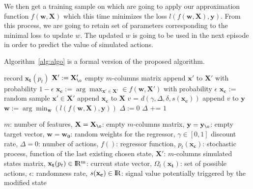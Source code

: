 \documentclass[letterpaper, 10.5 pt, conference]{ieeeconf}
\newcommand{\B}[1]{\mathbf{#1}}
\begin{document}
We then get a training sample on which are going to apply our approximation function $f(\B{w}, \B{X})$ which this time minimizes the loss $l(f(\B{w}, \B{X}),\B{y})$. From this process, we are going to retain set of parameters corresponding to the minimal loss to update $w$. The updated $w$ is going to be used in the next episode in order to predict the value of simulated actions.

Algorithm~\ref{alg:algo} is a formal version of the proposed algorithm.

\begin{algorithm}

\begin{algorithmic}[1]

\vspace{3mm}
  \State record $\B{x_t}(p_t)$
    \State $\B{X'} :=\B{X'_{\o}}$ empty $m$-columns matrix
    \For{$\B{x'}$  in  $\Omega(\B{x_t})$}
      \State append  $\B{x'}$  to  $\B{X'}$
    \EndFor
    \State with probability  $1-\epsilon$
    \State \hspace{0.5cm} $\B{x_c}:=\arg\max_{\B{x'} \in \B{X'}} \in f(\B{w},\B{X'})$
    \State with probability  $\epsilon$
    \State \hspace{0.5cm} $\B{x_c}$ := random sample $\B{x'} \in \B{X'}$
    \State append $\B{x_c}$ to $\B{X}$
    \If{$s(\B{x_c})$  !=  $0$}
        \State $v$ = $d(\gamma, \Delta, \delta, s(\B{x_c}))$
        \State append  $v$  to  $\B{y}$
       \EndFor
      \State $\B{w} := \arg\min_{\B{w}}(l(f(\B{w},\B{X}),\B{y}))$
      \State $\Delta := 0$
    \Else
      \State $\Delta$ += $1$
    \EndIf
\EndWhile

\end{algorithmic}

\caption{}
\label{alg:algo}

\vspace{3mm}
\begin{small} $m$: number of features, $\B{X}=\B{X_{\o}}$: empty $m$-columns matrix, $\B{y}=\B{y_{\o}}$: empty target vector, $\B{w}=\B{w_0}$: random weights for the regressor, $\gamma \in [0,1]$  discount rate, $\Delta = 0$: number of actions, $f()$: regressor function, $p_t(\B{x_c})$: stochastic process, function of the last existing chosen state, $\B{X'}$: $m$-columns simulated states matrix, $\B{x_t}(p_t) \in {\rm I\!R^m}$: current state vector, $\Omega_t(\B{x_t})$: set of possible actions, $\epsilon$: randomness rate, $s(\B{x_c}) \in {\rm I\!R}$: signal value potentially triggered by the modified state \end{small}

\end{algorithm}
\end{document}
